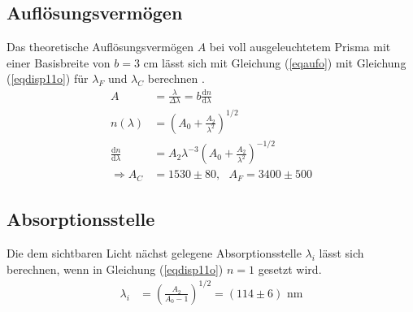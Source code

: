 \subsection{Auflösungsvermögen}
Das theoretische Auflösungsvermögen $A$ bei voll ausgeleuchtetem Prisma mit einer Basisbreite von
$b=3$ cm  lässt sich mit Gleichung (\ref{eqaufo}) mit Gleichung (\ref{eqdisp11o}) für $\lambda_F$ und $\lambda_C$ berechnen \cite{anleitung}.
\begin{align}
A&=\frac{\lambda}{\Delta \lambda}=b\frac{\text{d}n}{\text{d}\lambda} \label{eqaufo}\\
n(\lambda)&=\left(A_0+\frac{A_2}{\lambda^2} \right)^{1/2}\\
\frac{\text{d}n}{\text{d}\lambda}&=A_2 \lambda^{-3} \left( A_0+\frac{A_2}{\lambda^2}\right)^{-1/2} \\
\Rightarrow A_C&=1530\pm80,\text{ }A_F=3400\pm500
\end{align}

\subsection{Absorptionsstelle}
Die dem sichtbaren Licht nächst gelegene Absorptionsstelle $\lambda_i$ lässt sich berechnen, wenn in Gleichung
(\ref{eqdisp11o}) $n=1$ gesetzt wird.
\begin{align}
\lambda_i&=\left( \frac{A_2}{A_0-1} \right)^{1/2}=(114\pm 6)\text{ nm}
\end{align}




